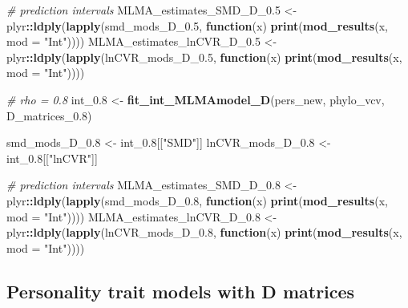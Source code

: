 \documentclass[]{article}
\newenvironment{Shaded}{\begin{snugshade}}{\end{snugshade}}
\newcommand{\KeywordTok}[1]{\textcolor[rgb]{0.13,0.29,0.53}{\textbf{#1}}}
\newcommand{\DataTypeTok}[1]{\textcolor[rgb]{0.13,0.29,0.53}{#1}}
\newcommand{\FloatTok}[1]{\textcolor[rgb]{0.00,0.00,0.81}{#1}}
\newcommand{\StringTok}[1]{\textcolor[rgb]{0.31,0.60,0.02}{#1}}
\newcommand{\CommentTok}[1]{\textcolor[rgb]{0.56,0.35,0.01}{\textit{#1}}}
\newcommand{\ControlFlowTok}[1]{\textcolor[rgb]{0.13,0.29,0.53}{\textbf{#1}}}
\newcommand{\OperatorTok}[1]{\textcolor[rgb]{0.81,0.36,0.00}{\textbf{#1}}}
\newcommand{\NormalTok}[1]{#1}
\begin{document}
\begin{Shaded}
\begin{Highlighting}[]
    \CommentTok{# prediction intervals}
\NormalTok{    MLMA_estimates_SMD_D_}\FloatTok{0.5}\NormalTok{ <-}\StringTok{ }\NormalTok{plyr}\OperatorTok{::}\KeywordTok{ldply}\NormalTok{(}\KeywordTok{lapply}\NormalTok{(smd_mods_D_}\FloatTok{0.5}\NormalTok{, }
                             \ControlFlowTok{function}\NormalTok{(x) }\KeywordTok{print}\NormalTok{(}\KeywordTok{mod_results}\NormalTok{(x, }\DataTypeTok{mod =} \StringTok{"Int"}\NormalTok{)))) }
\NormalTok{    MLMA_estimates_lnCVR_D_}\FloatTok{0.5}\NormalTok{ <-}\StringTok{ }\NormalTok{plyr}\OperatorTok{::}\KeywordTok{ldply}\NormalTok{(}\KeywordTok{lapply}\NormalTok{(lnCVR_mods_D_}\FloatTok{0.5}\NormalTok{, }
                              \ControlFlowTok{function}\NormalTok{(x) }\KeywordTok{print}\NormalTok{(}\KeywordTok{mod_results}\NormalTok{(x, }\DataTypeTok{mod =} \StringTok{"Int"}\NormalTok{))))}
    
    \CommentTok{# rho = 0.8}
\NormalTok{    int_}\FloatTok{0.8}\NormalTok{ <-}\StringTok{ }\KeywordTok{fit_int_MLMAmodel_D}\NormalTok{(pers_new, phylo_vcv, D_matrices_}\FloatTok{0.8}\NormalTok{) }
    
\NormalTok{    smd_mods_D_}\FloatTok{0.8}\NormalTok{ <-}\StringTok{ }\NormalTok{int_}\FloatTok{0.8}\NormalTok{[[}\StringTok{"SMD"}\NormalTok{]] }
\NormalTok{    lnCVR_mods_D_}\FloatTok{0.8}\NormalTok{ <-}\StringTok{ }\NormalTok{int_}\FloatTok{0.8}\NormalTok{[[}\StringTok{"lnCVR"}\NormalTok{]] }
    
    \CommentTok{# prediction intervals}
\NormalTok{    MLMA_estimates_SMD_D_}\FloatTok{0.8}\NormalTok{ <-}\StringTok{ }\NormalTok{plyr}\OperatorTok{::}\KeywordTok{ldply}\NormalTok{(}\KeywordTok{lapply}\NormalTok{(smd_mods_D_}\FloatTok{0.8}\NormalTok{, }
                           \ControlFlowTok{function}\NormalTok{(x) }\KeywordTok{print}\NormalTok{(}\KeywordTok{mod_results}\NormalTok{(x, }\DataTypeTok{mod =} \StringTok{"Int"}\NormalTok{)))) }
\NormalTok{    MLMA_estimates_lnCVR_D_}\FloatTok{0.8}\NormalTok{ <-}\StringTok{ }\NormalTok{plyr}\OperatorTok{::}\KeywordTok{ldply}\NormalTok{(}\KeywordTok{lapply}\NormalTok{(lnCVR_mods_D_}\FloatTok{0.8}\NormalTok{, }
                              \ControlFlowTok{function}\NormalTok{(x) }\KeywordTok{print}\NormalTok{(}\KeywordTok{mod_results}\NormalTok{(x, }\DataTypeTok{mod =} \StringTok{"Int"}\NormalTok{))))}
\end{Highlighting}
\end{Shaded}

\subsection{Personality trait models with D
matrices}\label{personality-trait-models-with-d-matrices}
\end{document}
